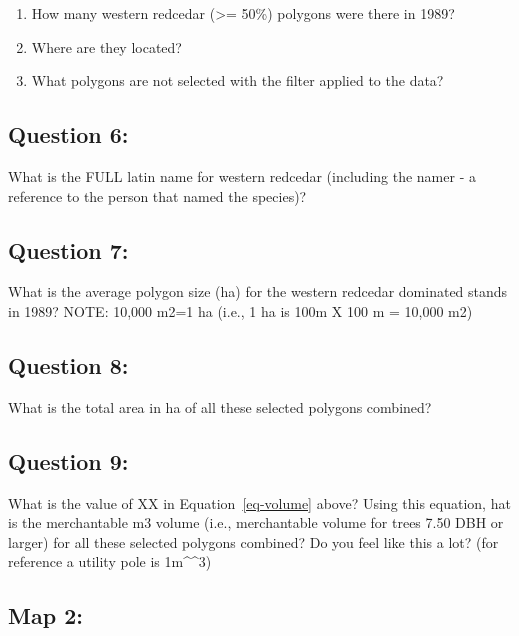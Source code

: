 \documentclass[
  letterpaper,
]{book}
\providecommand{\tightlist}{%
  \setlength{\itemsep}{0pt}\setlength{\parskip}{0pt}}\usepackage{longtable,booktabs,array}
\begin{document}
\begin{enumerate}
\def\labelenumi{\Alph{enumi}.}
\tightlist
\item
  How many western redcedar (\textgreater= 50\%) polygons were there in
  1989?
\item
  Where are they located?
\item
  What polygons are not selected with the filter applied to the data?
\end{enumerate}

\hypertarget{question-6}{%
\subsection*{Question 6:}\label{question-6}}

What is the FULL latin name for western redcedar (including the namer -
a reference to the person that named the species)?

\hypertarget{sec-Q7}{%
\subsection*{Question 7:}\label{sec-Q7}}

What is the average polygon size (ha) for the western redcedar dominated
stands in 1989? NOTE: 10,000 m2=1 ha (i.e., 1 ha is 100m X 100 m =
10,000 m2)

\hypertarget{question-8}{%
\subsection*{Question 8:}\label{question-8}}

What is the total area in ha of all these selected polygons combined?

\hypertarget{question-9}{%
\subsection*{Question 9:}\label{question-9}}

What is the value of XX in Equation~\ref{eq-volume} above? Using this
equation, hat is the merchantable m3 volume (i.e., merchantable volume
for trees 7.50 DBH or larger) for all these selected polygons combined?
Do you feel like this a lot? (for reference a utility pole is
1m\^{}\^{}3)

\hypertarget{map-2}{%
\subsection*{Map 2:}\label{map-2}}
\end{document}
